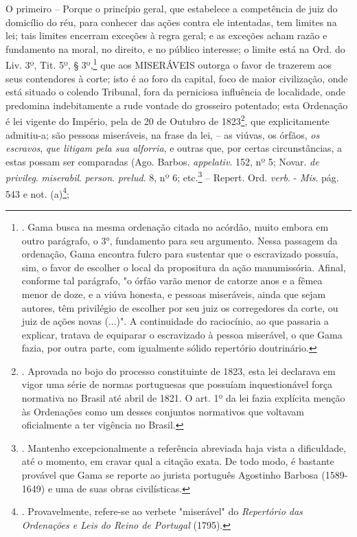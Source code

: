 O primeiro -- Porque o princípio geral, que estabelece a competência de
juiz do domicílio do réu, para conhecer das ações contra ele intentadas,
tem limites na lei; tais limites encerram exceções à regra geral; e as
exceções acham razão e fundamento na moral, no direito, e no público
interesse; o limite está na Ord. do Liv. 3º, Tit. 5º, § 3º,\footnote{.
  Gama busca na mesma ordenação citada no acórdão, muito embora em outro
  parágrafo, o 3°, fundamento para seu argumento. Nessa passagem da
  ordenação, Gama encontra fulcro para sustentar que o escravizado
  possuía, sim, o favor de escolher o local da propositura da ação
  manumissória. Afinal, conforme tal parágrafo, "o órfão varão menor de
  catorze anos e a fêmea menor de doze, e a viúva honesta, e pessoas
  miseráveis, ainda que sejam autores, têm privilégio de escolher por
  seu juiz os corregedores da corte, ou juiz de ações novas (...)". A
  continuidade do raciocínio, ao que passaria a explicar, tratava de
  equiparar o escravizado à pessoa miserável, o que Gama fazia, por
  outra parte, com igualmente sólido repertório doutrinário.} que aos
MISERÁVEIS outorga o favor de trazerem aos seus contendores à corte;
isto é ao foro da capital, foco de maior civilização, onde está situado
o colendo Tribunal, fora da perniciosa influência de localidade, onde
predomina indebitamente a rude vontade do grosseiro potentado; esta
Ordenação é lei vigente do Império, pela de 20 de Outubro de
1823\footnote{. Aprovada no bojo do processo constituinte de 1823, esta
  lei declarava em vigor uma série de normas portuguesas que possuíam
  inquestionável força normativa no Brasil até abril de 1821. O art. 1º
  da lei fazia explícita menção às Ordenações como um desses conjuntos
  normativos que voltavam oficialmente a ter vigência no Brasil.}, que
explicitamente admitiu-a; são pessoas miseráveis, na frase da lei, -- as
viúvas, os órfãos, \emph{os escravos}, \emph{que litigam pela sua
alforria}, e outras que, por certas circunstâncias, a estas possam ser
comparadas (Ago. Barbos. \emph{appelativ}. 152, nº 5; Novar. \emph{de
privileg}. \emph{miserabil}. \emph{person}. \emph{prelud}. 8, nº 6;
etc.\footnote{. Mantenho excepcionalmente a referência abreviada haja
  vista a dificuldade, até o momento, em cravar qual a citação exata. De
  todo modo, é bastante provável que Gama se reporte ao jurista
  português Agostinho Barbosa (1589-1649) e uma de suas obras
  civilísticas.} -- Repert. Ord. \emph{verb}. - \emph{Mis}. pág. 543 e
not. (a)\footnote{. Provavelmente, refere-se ao verbete "miserável" do
  \emph{Repertório das Ordenações e Leis do Reino de Portugal} (1795).};
